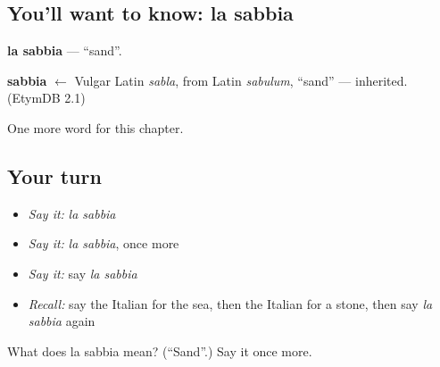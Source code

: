 \subsection*{You'll want to know: la sabbia}
\textbf{la sabbia} — \textquotedblleft{}sand\textquotedblright{}.

\begin{cousinweb}
\textbf{sabbia} $\leftarrow$ Vulgar Latin \emph{sabla}, from Latin \emph{sabulum}, \textquotedblleft{}sand\textquotedblright{} — inherited. (EtymDB 2.1)
\end{cousinweb}

\begin{grammarlens}[title={What you've built}]
One more word for this chapter.
\end{grammarlens}

\subsection*{Your turn}
\begin{itemize}
\raggedright
  \item \emph{Say it:} \emph{la sabbia}
  \item \emph{Say it:} \emph{la sabbia}, once more
  \item \emph{Say it:} say \emph{la sabbia}
  \item \emph{Recall:} say the Italian for the sea, then the Italian for a stone, then say \emph{la sabbia} again
\end{itemize}

\begin{tcolorbox}[breakable,colback=teal!4,colframe=teal!35!black,title={Before you move on}]
What does la sabbia mean? (\textquotedblleft{}Sand\textquotedblright{}.) Say it once more.
\end{tcolorbox}
